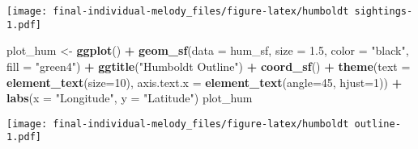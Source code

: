 \documentclass[
]{article}
\newenvironment{Shaded}{\begin{snugshade}}{\end{snugshade}}
\newcommand{\AttributeTok}[1]{\textcolor[rgb]{0.13,0.29,0.53}{#1}}
\newcommand{\DecValTok}[1]{\textcolor[rgb]{0.00,0.00,0.81}{#1}}
\newcommand{\FloatTok}[1]{\textcolor[rgb]{0.00,0.00,0.81}{#1}}
\newcommand{\FunctionTok}[1]{\textcolor[rgb]{0.13,0.29,0.53}{\textbf{#1}}}
\newcommand{\NormalTok}[1]{#1}
\newcommand{\OtherTok}[1]{\textcolor[rgb]{0.56,0.35,0.01}{#1}}
\newcommand{\SpecialCharTok}[1]{\textcolor[rgb]{0.81,0.36,0.00}{\textbf{#1}}}
\newcommand{\StringTok}[1]{\textcolor[rgb]{0.31,0.60,0.02}{#1}}
\begin{document}
\texttt{[image: final-individual-melody\_files/figure-latex/humboldt sightings-1.pdf]}

\begin{Shaded}
\begin{Highlighting}[]
\NormalTok{plot\_hum }\OtherTok{\textless{}{-}} \FunctionTok{ggplot}\NormalTok{() }\SpecialCharTok{+} 
  \FunctionTok{geom\_sf}\NormalTok{(}\AttributeTok{data =}\NormalTok{ hum\_sf, }\AttributeTok{size =} \FloatTok{1.5}\NormalTok{, }\AttributeTok{color =} \StringTok{"black"}\NormalTok{, }\AttributeTok{fill =} \StringTok{"green4"}\NormalTok{) }\SpecialCharTok{+} 
  \FunctionTok{ggtitle}\NormalTok{(}\StringTok{"Humboldt Outline"}\NormalTok{) }\SpecialCharTok{+} 
  \FunctionTok{coord\_sf}\NormalTok{() }\SpecialCharTok{+} \FunctionTok{theme}\NormalTok{(}\AttributeTok{text =} \FunctionTok{element\_text}\NormalTok{(}\AttributeTok{size=}\DecValTok{10}\NormalTok{),}
        \AttributeTok{axis.text.x =} \FunctionTok{element\_text}\NormalTok{(}\AttributeTok{angle=}\DecValTok{45}\NormalTok{, }\AttributeTok{hjust=}\DecValTok{1}\NormalTok{)) }\SpecialCharTok{+} \FunctionTok{labs}\NormalTok{(}\AttributeTok{x =} \StringTok{"Longitude"}\NormalTok{, }\AttributeTok{y =} \StringTok{"Latitude"}\NormalTok{)}
\NormalTok{plot\_hum}
\end{Highlighting}
\end{Shaded}

\texttt{[image: final-individual-melody\_files/figure-latex/humboldt outline-1.pdf]}
\end{document}
